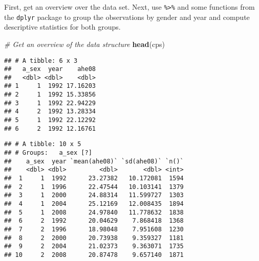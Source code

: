 \documentclass[]{book}
\newenvironment{Shaded}{\begin{snugshade}}{\end{snugshade}}
\newcommand{\KeywordTok}[1]{\textcolor[rgb]{0.13,0.29,0.53}{\textbf{#1}}}
\newcommand{\StringTok}[1]{\textcolor[rgb]{0.31,0.60,0.02}{#1}}
\newcommand{\CommentTok}[1]{\textcolor[rgb]{0.56,0.35,0.01}{\textit{#1}}}
\newcommand{\OperatorTok}[1]{\textcolor[rgb]{0.81,0.36,0.00}{\textbf{#1}}}
\newcommand{\NormalTok}[1]{#1}
\theoremstyle{definition}
\theoremstyle{definition}
\theoremstyle{definition}
\theoremstyle{remark}
\begin{document}
First, get an overview over the data set. Next, use
\texttt{\%\textgreater{}\%} and some functions from the \texttt{dplyr}
package to group the observations by gender and year and compute
descriptive statistics for both groups.

\begin{Shaded}
\begin{Highlighting}[]
\CommentTok{# Get an overview of the data structure}
\KeywordTok{head}\NormalTok{(cps)}
\end{Highlighting}
\end{Shaded}

\begin{verbatim}
## # A tibble: 6 x 3
##   a_sex  year    ahe08
##   <dbl> <dbl>    <dbl>
## 1     1  1992 17.16203
## 2     1  1992 15.33856
## 3     1  1992 22.94229
## 4     2  1992 13.28334
## 5     1  1992 22.12292
## 6     2  1992 12.16761
\end{verbatim}

\begin{Shaded}
\end{Shaded}

\begin{verbatim}
## # A tibble: 10 x 5
## # Groups:   a_sex [?]
##    a_sex  year `mean(ahe08)` `sd(ahe08)` `n()`
##    <dbl> <dbl>         <dbl>       <dbl> <int>
##  1     1  1992      23.27382   10.172081  1594
##  2     1  1996      22.47544   10.103141  1379
##  3     1  2000      24.88314   11.599727  1303
##  4     1  2004      25.12169   12.008435  1894
##  5     1  2008      24.97840   11.778632  1838
##  6     2  1992      20.04629    7.868418  1368
##  7     2  1996      18.98048    7.951608  1230
##  8     2  2000      20.73938    9.359327  1181
##  9     2  2004      21.02373    9.363071  1735
## 10     2  2008      20.87478    9.657140  1871
\end{verbatim}
\end{document}
